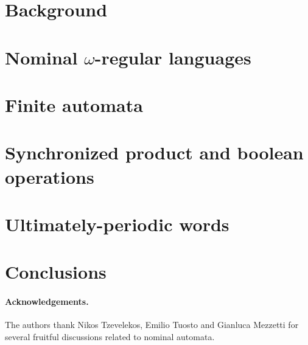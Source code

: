 \documentclass[orivec]{llncs}
\begin{document}
\section{Background}\label{sec:background}

\section{Nominal \texorpdfstring{$\omega$}{omega}-regular languages}\label{sec:languages}


\section{Finite automata}\label{sec:hd-automata}



\section{Synchronized product and boolean operations}\label{sec:sync-product}

%


\section{Ultimately-periodic words}\label{sec:up-words}

\section{Conclusions}\label{sec:conclusions}



\paragraph{Acknowledgements.} The authors thank Nikos Tzevelekos, Emilio Tuosto and Gianluca Mezzetti for several fruitful discussions related to nominal automata.



%

% 
\end{document}
